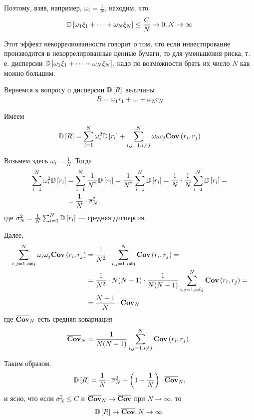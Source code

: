 Поэтому, взяв, например, $\omega_i = \frac{1}{N}$, находим, что
\begin{align}
\mathbb{D}\left[\omega_1 \xi_1 + \dots + \omega_N \xi_N\right] \le \frac{C}{N} \rightarrow 0, N \rightarrow \infty
\end{align}

Этот эффект некоррелиованности говорит о том, что если инвестирование производится в некоррелированные ценные бумаги, то для уменьшения риска,
т. е. дисперсии $\mathbb{D}\left[\omega_1 \xi_1 + \dots + \omega_N \xi_N\right]$, надо по возможности брать их число $N$ как можно большим.

Вернемся к вопросу о дисперсии $\mathbb{D}\left[R\right]$ величины
\begin{align}
	R = \omega_1 r_1 + \dots + \omega_N r_N
\end{align}

Имеем
\begin{align}
	\mathbb{D}\left[R\right] = \sum_{i=1}^{N} \omega_i^2 \mathbb{D}\left[r_i\right] + \sum_{i, j = 1, i \ne j}^{N} \omega_i \omega_j \textbf{Cov}\left(r_i, r_j\right)
\end{align}

Возьмем здесь $\omega_i = \frac{1}{N}$. Тогда
\begin{align}
	\sum_{i=1}^{N} \omega_i^2 \mathbb{D}\left[r_i\right]
	&= \sum_{i=1}^{N} \frac{1}{N^2} \mathbb{D}\left[r_i\right]
	= \frac{1}{N^2} \sum_{i=1}^{N} \mathbb{D}\left[r_i\right]
	= \frac{1}{N} \cdot \frac{1}{N} \sum_{i=1}^{N} \mathbb{D}\left[r_i\right] = \\
	&= \frac{1}{N} \cdot \overline{\sigma}_N^2 ,
\end{align}
где $\bar{\sigma}_N^2 = \frac{1}{N} \sum_{i=1}^{N} \mathbb{D}\left[r_i\right]$ --- средняя дисперсия. 

Далее,
\begin{align}
	\sum_{i, j = 1, i \ne j}^{N} \omega_i \omega_j \textbf{Cov}\left(r_i, r_j\right)
	&= \frac{1}{N^2} \cdot \sum_{i, j = 1, i \ne j}^{N} \textbf{Cov}\left(r_i, r_j\right) = \\
	&= \frac{1}{N^2} \cdot N (N-1) \cdot \frac{1}{N (N-1)} \sum_{i, j = 1, i \ne j}^{N} \textbf{Cov}\left(r_i, r_j\right) = \\
	&= \frac{N-1}{N} \cdot \overline{\textbf{Cov}}_N
\end{align}
где $\overline{\textbf{Cov}}_N$ есть средняя ковариация
\begin{align}
\overline{\textbf{Cov}}_N = \frac{1}{N (N - 1)} \sum_{i, j = 1, i \ne j}^{N} \textbf{Cov}\left(r_i, r_j\right) .
\end{align}

Таким образом,
\begin{align} \label{eq:DR_decomposition}
	\mathbb{D}\left[R\right] = \frac{1}{N} \cdot \overline{\sigma}_N^2 + \left(1 - \frac{1}{N}\right) \cdot \overline{\textbf{Cov}}_N ,
\end{align}
и ясно, что если $\overline{\sigma}_N^2 \le C$ и $\overline{\textbf{Cov}}_N \rightarrow \overline{\textbf{Cov}}$ при $N \rightarrow \infty$, то
\begin{align}
	\mathbb{D}\left[R\right] \rightarrow \overline{\textbf{Cov}}, N \rightarrow \infty .
\end{align}

